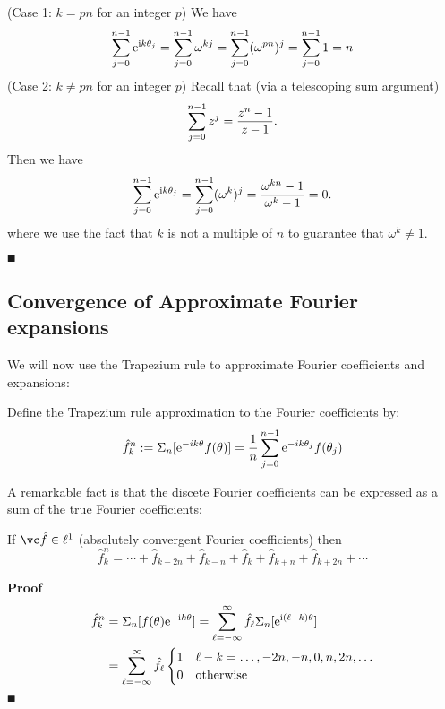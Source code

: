 (Case 1: $k = pn$ for an integer $p$) We have
\[
\ensuremath{\sum}_{j=0}^{n-1} {\rm e}^{{\rm i} k \ensuremath{\theta}_j} = \ensuremath{\sum}_{j=0}^{n-1} \ensuremath{\omega}^{kj} = \ensuremath{\sum}_{j=0}^{n-1} ({\ensuremath{\omega}^{pn}})^j =   \ensuremath{\sum}_{j=0}^{n-1} 1 = n
\]
(Case 2: $k \ensuremath{\neq} pn$ for an integer $p$)  Recall that (via a telescoping sum argument)
\[
\ensuremath{\sum}_{j=0}^{n-1} z^j = {z^n-1 \over z-1}.
\]
Then we have
\[
\ensuremath{\sum}_{j=0}^{n-1} {\rm e}^{{\rm i} k \ensuremath{\theta}_j} = \ensuremath{\sum}_{j=0}^{n-1} (\ensuremath{\omega}^k)^j = {\ensuremath{\omega}^{kn} -1 \over \ensuremath{\omega}^k -1} = 0.
\]
where we use the fact that $k$ is not a multiple of $n$ to guarantee that $\ensuremath{\omega}^k \ensuremath{\neq} 1$.

\ensuremath{\QED}

\subsection{Convergence of Approximate Fourier expansions}
We will now use the Trapezium rule to approximate Fourier coefficients and expansions:

\begin{definition} Define the Trapezium rule approximation to the Fourier coefficients by:
\[
\hat f_k^n := \ensuremath{\Sigma}_n[{\rm e}^{-i k \ensuremath{\theta}} f(\ensuremath{\theta})]  = {1 \over n} \ensuremath{\sum}_{j=0}^{n-1} {\rm e}^{-i k \ensuremath{\theta}_j} f(\ensuremath{\theta}_j)
\]
\end{definition}

A remarkable fact is that the discete Fourier coefficients can be expressed as a sum of the true Fourier coefficients:

\begin{theorem} If $\vchatf \ensuremath{\in} \ensuremath{\ell}^1$ (absolutely convergent Fourier coefficients) then
\[
\hat f_k^n = \ensuremath{\cdots} + \hat f_{k-2n} + \hat f_{k-n} + \hat f_k + \hat f_{k+n} + \hat f_{k+2n} + \ensuremath{\cdots}
\]
\end{theorem}
\textbf{Proof}
\begin{align*}
\hat f_k^n &= \ensuremath{\Sigma}_n[f(\ensuremath{\theta}) {\rm e}^{-{\rm i} k \ensuremath{\theta}}] = \ensuremath{\sum}_{\ensuremath{\ell}=-\ensuremath{\infty}}^\ensuremath{\infty} \hat f_\ensuremath{\ell} \ensuremath{\Sigma}_n[{\rm e}^{{\rm i} (\ensuremath{\ell}-k) \ensuremath{\theta}}] \\
&= \ensuremath{\sum}_{\ensuremath{\ell}=-\ensuremath{\infty}}^\ensuremath{\infty} \hat f_\ensuremath{\ell} \begin{cases} 1 & \ensuremath{\ell}-k = \ldots,-2n,-n,0,n,2n,\ldots  \cr
0 & \hbox{otherwise}
\end{cases}
\end{align*}
\ensuremath{\QED}

